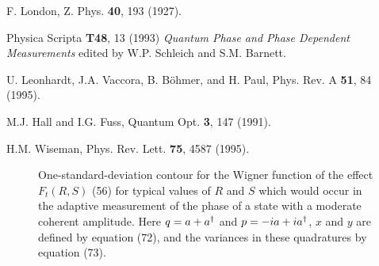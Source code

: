 \begin{thebibliography}{99}
F. London, 
Z. Phys. {\bf 40}, 193 (1927).

Physica Scripta {\bf T48}, 13 (1993)
{\em Quantum Phase and Phase Dependent Measurements}
edited by W.P. Schleich and S.M. Barnett.

U. Leonhardt, J.A. Vaccora, B. B{\"o}hmer, and H. Paul,
Phys. Rev. A {\bf 51}, 84 (1995).

M.J. Hall and I.G. Fuss,
Quantum Opt. {\bf 3}, 147 (1991).

H.M. Wiseman,
Phys. Rev. Lett. {\bf 75}, 4587 (1995).


\end{thebibliography}

\newpage

\begin{figure}
\caption
{One-standard-deviation contour for the Wigner function of the effect
$F_t(R,S)$  (56)
for typical values of $R$ and $S$ which would occur in
the adaptive measurement of the phase of a state with a moderate coherent
amplitude. Here $q=a+a^\dagger$ and $p = -ia+ia^\dagger$, $x$ and $y$ are defined by
equation (72),
and the variances in these quadratures by equation (73).}
\end{figure}





